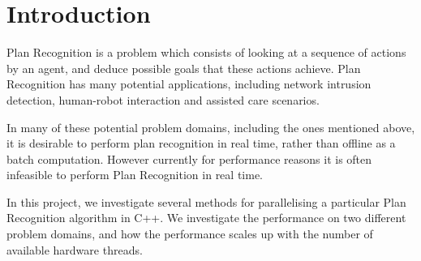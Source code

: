 \chapter{Introduction}

Plan Recognition is a problem which consists of looking at a sequence of actions by an agent, and deduce possible goals that these actions achieve. Plan Recognition has many potential applications, including network intrusion detection, human-robot interaction and assisted care scenarios.

In many of these potential problem domains, including the ones mentioned above, it is desirable to perform plan recognition in real time, rather than offline as a batch computation. However currently for performance reasons it is often infeasible to perform Plan Recognition in real time.

In this project, we investigate several methods for parallelising a particular Plan Recognition algorithm in C++. We investigate the performance on two different problem domains, and how the performance scales up with the number of available hardware threads.

